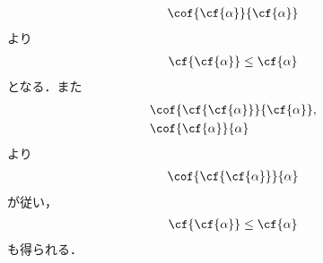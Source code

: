 	\begin{sketch}
		\begin{align}
			\cof{\cf{\alpha}}{\cf{\alpha}}
		\end{align}
		より
		\begin{align}
			\cf{\cf{\alpha}} \leq \cf{\alpha}
		\end{align}
		となる．また
		\begin{align}
			&\cof{\cf{\cf{\alpha}}}{\cf{\alpha}}, \\
			&\cof{\cf{\alpha}}{\alpha}
		\end{align}
		より
		\begin{align}
			\cof{\cf{\cf{\alpha}}}{\alpha}
		\end{align}
		が従い，
		\begin{align}
			\cf{\cf{\alpha}} \leq \cf{\alpha}
		\end{align}
		も得られる．
		\QED
	\end{sketch}
	
